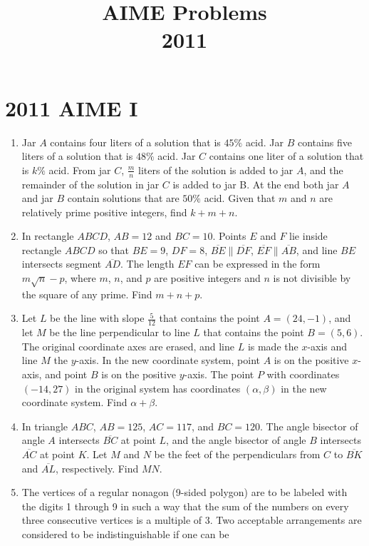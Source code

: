 \documentclass{article}
\title{AIME Problems \\ 2011}
\date{}
\begin{document}
\maketitle\thispagestyle{fancy}\newpage\section*{2011 AIME I}
\begin{enumerate}[label=\arabic*., itemsep=0.5em]
\item Jar \(A\) contains four liters of a solution that is \(45\%\) acid. Jar \(B\) contains five liters of a solution that is \(48\%\) acid. Jar \(C\) contains one liter of a solution that is \(k\%\) acid. From jar \(C\), \(\frac{m}{n}\) liters of the solution is added to jar \(A\), and the remainder of the solution in jar \(C\) is added to jar B. At the end both jar \(A\) and jar \(B\) contain solutions that are \(50\%\) acid. Given that \(m\) and \(n\) are relatively prime positive integers, find \(k + m + n\).\par \vspace{0.5em}\item In rectangle \(ABCD\), \(AB = 12\) and \(BC = 10\).  Points \(E\) and \(F\) lie inside rectangle \(ABCD\) so that \(BE = 9\), \(DF = 8\), \(\overline{BE} \parallel \overline{DF}\), \(\overline{EF} \parallel \overline{AB}\), and line \(BE\) intersects segment \(\overline{AD}\).  The length \(EF\) can be expressed in the form \(m \sqrt{n} - p\), where \(m\), \(n\), and \(p\) are positive integers and \(n\) is not divisible by the square of any prime.  Find \(m + n + p\).\par \vspace{0.5em}\item Let \(L\) be the line with slope \(\frac{5}{12}\) that contains the point \(A = (24,-1)\), and let \(M\) be the line perpendicular to line \(L\) that contains the point \(B = (5,6)\).  The original coordinate axes are erased, and line \(L\) is made the \(x\)-axis and line \(M\) the \(y\)-axis.  In the new coordinate system, point \(A\) is on the positive \(x\)-axis, and point \(B\) is on the positive \(y\)-axis.  The point \(P\) with coordinates \((-14,27)\) in the original system has coordinates \((\alpha,\beta)\) in the new coordinate system.  Find \(\alpha + \beta\).\par \vspace{0.5em}\item In triangle \(ABC\), \(AB = 125\), \(AC = 117\), and \(BC = 120\).  The angle bisector of angle \(A\) intersects \(\overline{BC}\) at point \(L\), and the angle bisector of angle \(B\) intersects \(\overline{AC}\) at point \(K\).  Let \(M\) and \(N\) be the feet of the perpendiculars from \(C\) to \(\overline{BK}\) and \(\overline{AL}\), respectively.  Find \(MN\).\par \vspace{0.5em}\item The vertices of a regular nonagon (9-sided polygon) are to be labeled with the digits 1 through 9 in such a way that the sum of the numbers on every three consecutive vertices is a multiple of 3.  Two acceptable arrangements are considered to be indistinguishable if one can be 
\end{enumerate}
\end{document}
